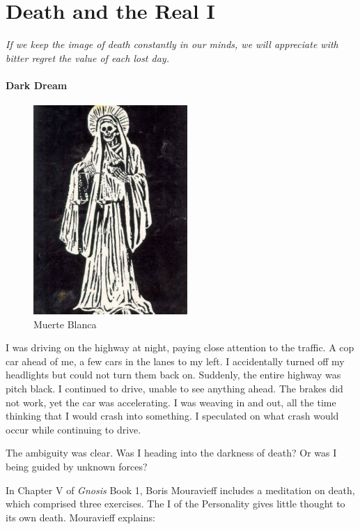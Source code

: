 \section{Death and the Real I}

\emph{If we keep the image of death constantly in our minds, we will appreciate with bitter regret the value of each lost day.}

\paragraph{Dark Dream}

\begin{figure}
\centering
\includegraphics[scale=.5]{a20191027DeathandtheRealI-img001.jpg} 
\caption{Muerte Blanca} 
\end{figure}

I was driving on the highway at night, paying close attention to the traffic. A cop car ahead of me, a few cars in the lanes to my left. I accidentally turned off my headlights but could not turn them back on. Suddenly, the entire highway was pitch black. I continued to drive, unable to see anything ahead. The brakes did not work, yet the car was accelerating. I was weaving in and out, all the time thinking that I would crash into something. I speculated on what crash would occur while continuing to drive.

The ambiguity was clear. Was I heading into the darkness of death? Or was I being guided by unknown forces?

In Chapter V of \emph{Gnosis} Book 1, Boris Mouravieff includes a meditation on death, which comprised three exercises. The I of the Personality gives little thought to its own death. Mouravieff explains:

